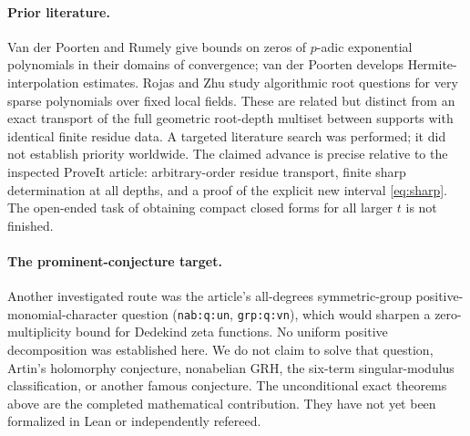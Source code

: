 \documentclass[11pt]{article}
\theoremstyle{remark}\newtheorem{remark}[theorem]{Remark}
\begin{document}
\paragraph{Prior literature.}
Van der Poorten and Rumely \cite{vpr} give bounds on zeros of $p$-adic exponential
polynomials in their domains of convergence; van der Poorten \cite{vdP} develops
Hermite-interpolation estimates. Rojas and Zhu \cite{rz} study algorithmic root
questions for very sparse polynomials over fixed local fields. These are related
but distinct from an exact transport of the full geometric root-depth multiset
between supports with identical finite residue data. A targeted literature search
was performed; it did not establish priority worldwide. The claimed advance is
precise relative to the inspected ProveIt article: arbitrary-order residue transport,
finite sharp determination at all depths, and a proof of the explicit new interval
\eqref{eq:sharp}. The open-ended task of obtaining compact closed forms for all
larger $t$ is not finished.

\paragraph{The prominent-conjecture target.}
Another investigated route was the article's all-degrees symmetric-group
positive-monomial-character question (\texttt{nab:q:un}, \texttt{grp:q:vn}), which
would sharpen a zero-multiplicity bound for Dedekind zeta functions. No uniform
positive decomposition was established here. We do not claim to solve that question,
Artin's holomorphy conjecture, nonabelian GRH, the six-term singular-modulus
classification, or another famous conjecture. The unconditional exact theorems above
are the completed mathematical contribution. They have not yet been formalized in
Lean or independently refereed.
\end{document}
